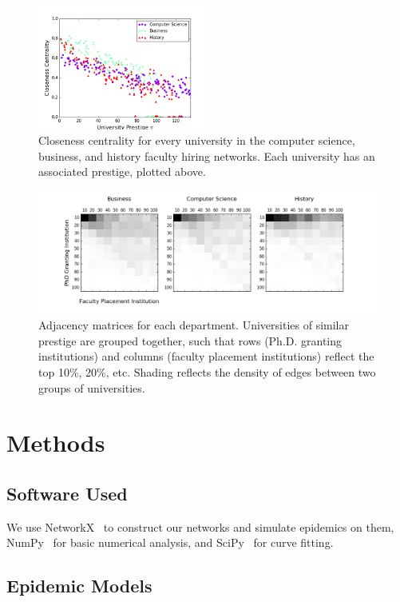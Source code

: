 \documentclass[%
 reprint,
 amsmath,amssymb,
 aps,
]{revtex4-1}
\begin{document}
\begin{figure}[h]
\centering
\includegraphics[width=0.5\textwidth]{figures/centrality.png}
\caption{Closeness centrality for every university in the computer science, business, and history faculty hiring networks. Each university has an associated prestige, plotted above.}
\label{centrality}
\end{figure}

\begin{figure}
	\centering
  \includegraphics[width=\textwidth]{figures/grouped_adjacency.png}
  \caption{Adjacency matrices for each department. Universities of similar prestige are grouped together, such that rows (Ph.D. granting institutions) and columns (faculty placement institutions) reflect the top 10\%, 20\%, etc. Shading reflects the density of edges between two groups of universities.}
   \label{adjacency}
\end{figure}

\section{\label{sec:level1}Methods}
\subsection{\label{sec:level2}Software Used}
We use NetworkX~\cite{networkx} to construct our networks and simulate epidemics on them, NumPy~\cite{numpy} for basic numerical analysis, and SciPy~\cite{scipy} for curve fitting.

\subsection{\label{sec:level2}Epidemic Models}
\end{document}
